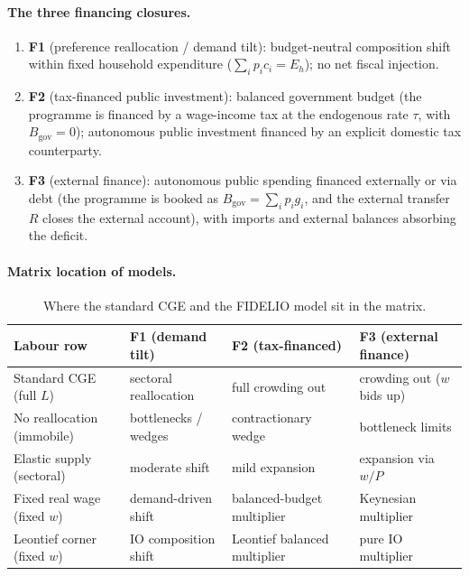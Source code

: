 \paragraph{The three financing closures.}
\begin{enumerate}
\item \textbf{F1} (preference reallocation / demand tilt): budget-neutral
  composition shift within fixed household expenditure
  ($\sum_i p_i c_i = E_h$); no net fiscal injection.
\item \textbf{F2} (tax-financed public investment): balanced government
  budget (the programme is financed by a wage-income tax at the endogenous
  rate $\tau$, with $B_{\mathrm{gov}}=0$); autonomous public investment
  financed by an explicit domestic tax counterparty.
\item \textbf{F3} (external finance): autonomous public
  spending financed externally or via debt (the programme is booked as
  $B_{\mathrm{gov}}=\sum_i p_i g_i$, and the external transfer $R$ closes the
  external account), with imports and external balances absorbing the deficit.
\end{enumerate}

\paragraph{Matrix location of models.}
\begin{table}[htbp]
\centering
\small
\begin{tabular}{l l l l}
\toprule
Labour row & F1 (demand tilt) & F2 (tax-financed) & F3 (external finance) \\
\midrule
Standard CGE (full $L$)   & sectoral reallocation & full crowding out & crowding out ($w$ bids up) \\
No reallocation (immobile)& bottlenecks / wedges  & contractionary wedge & bottleneck limits \\
Elastic supply (sectoral) & moderate shift        & mild expansion & expansion via $w/P$ \\
Fixed real wage (fixed $w$)& demand-driven shift   & balanced-budget multiplier & Keynesian multiplier \\
Leontief corner (fixed $w$)& IO composition shift  & Leontief balanced multiplier & pure IO multiplier \\
\bottomrule
\end{tabular}
\caption{Where the standard CGE and the FIDELIO model sit in the matrix.}
\label{tab:matrix-map}
\end{table}

